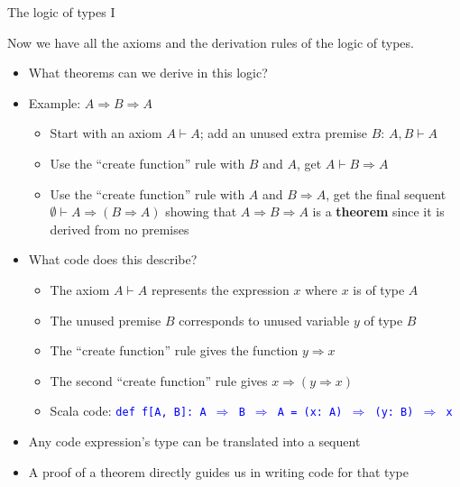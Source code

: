 \documentclass[english]{beamer}
\begin{document}
\begin{frame}{The logic of types I}

Now we have all the axioms and the derivation rules of the logic of
types.
\begin{itemize}
\item What theorems can we derive in this logic?
\item Example: $A\Rightarrow B\Rightarrow A$
\begin{itemize}
\item Start with an axiom $A\vdash A$; add an unused extra premise $B$:
$A,B\vdash A$
\item Use the ``create function'' rule with $B$ and $A$, get $A\vdash B\Rightarrow A$
\item Use the ``create function'' rule with $A$ and $B\Rightarrow A$,
get the final sequent $\emptyset\vdash A\Rightarrow\left(B\Rightarrow A\right)$
showing that $A\Rightarrow B\Rightarrow A$ is a \textbf{theorem}
since it is derived from no premises
\end{itemize}
\item What code does this describe?
\begin{itemize}
\item The axiom $A\vdash A$ represents the expression $x$ where $x$ is
of type $A$
\item The unused premise $B$ corresponds to unused variable $y$ of type
$B$
\item The ``create function'' rule gives the function $y\Rightarrow x$
\item The second ``create function'' rule gives $x\Rightarrow\left(y\Rightarrow x\right)$
\item Scala code: \texttt{\textcolor{blue}{\footnotesize{}def f{[}A, B{]}:\ A
$\Rightarrow$ B $\Rightarrow$ A = (x:\ A) $\Rightarrow$ (y:\ B)
$\Rightarrow$ x}}{\footnotesize \par}
\end{itemize}
\item Any code expression's type can be translated into a sequent
\item A proof of a theorem directly guides us in writing code for that type
\end{itemize}
\end{frame}
\end{document}
